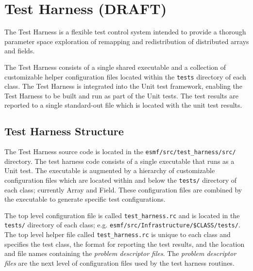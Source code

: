 \section{Test Harness (DRAFT)}
\label{sec:harness}


The Test Harness is a flexible test control system intended to provide a thorough parameter space exploration of remapping and redistribution of distributed arrays and fields.

The Test Harness consists of a single shared executable and a collection of customizable helper configuration files located within the \texttt{tests} directory of each class. The Test Harness is integrated into the Unit test framework, enabling the Test Harness to be built and run as part of the Unit tests. The test results are reported to a single standard-out file which is located with the unit test results.

\subsection{Test Harness Structure}
The Test Harness source code is  located in the \texttt{esmf/src/test\_harness/src/} directory. The test harness code consists of a single executable that runs as a Unit test. The executable is augmented by a hierarchy  of customizable configuration files which are located within and below the \texttt{tests/} directory of each class; currently Array and Field. These configuration files are combined by the executable to generate specific test configurations. 

The top level configuration file is called \texttt{test\_harness.rc} and is located in the \texttt{tests/} directory of each class; e.g. \texttt{esmf/src/Infrastructure/\$CLASS/tests/}. The top level helper file called \texttt{test\_harness.rc} is unique to each class and specifies the test class, the format for reporting the test results, and the location and file names containing the \textit{problem descriptor files}. The \textit{problem descriptor files} are the next level of configuration files used by the test harness routines.

